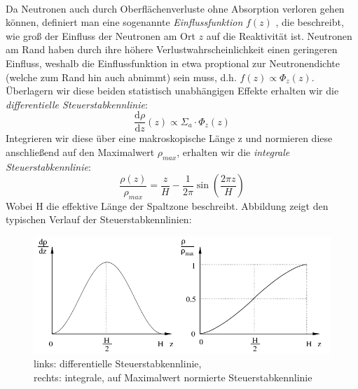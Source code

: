 	\ \\
	Da Neutronen auch durch Oberflächenverluste ohne Absorption verloren gehen können, definiert man eine sogenannte \textit{Einflussfunktion} $f(z)$ , die beschreibt, wie groß der Einfluss der Neutronen am Ort $z$ auf die Reaktivität ist. Neutronen am Rand haben durch ihre höhere Verlustwahrscheinlichkeit einen geringeren Einfluss, weshalb die Einflussfunktion in etwa proptional zur Neutronendichte (welche zum Rand hin auch abnimmt) sein muss, d.h. $f(z) \propto \Phi_z(z)$. Überlagern wir diese beiden statistisch unabhängigen Effekte erhalten wir die \textit{differentielle Steuerstabkennlinie}:\\
	$$\frac{\mathrm{d}\rho}{\mathrm{d}z}(z) \propto \Sigma_a \cdot \Phi_z(z)$$
	Integrieren wir diese über eine makroskopische Länge z und normieren diese anschließend auf den Maximalwert $\rho_{max}$, erhalten wir die \textit{integrale Steuerstabkennlinie}:
	$$\frac{\rho(z)}{\rho_{max}} = \frac{z}{H} - \frac{1}{2\pi} \sin{\left(\frac{2\pi z}{H}\right)}$$
	Wobei H die effektive Länge der Spaltzone beschreibt. Abbildung zeigt den typischen Verlauf der Steuerstabkennlinien:
		\begin{figure}[hp]
				\centering
				\captionsetup{justification=centering}
				\includegraphics[scale=0.4]{pic/sskl}
				\caption{links: differentielle Steuerstabkennlinie, 
						\\rechts: integrale, auf Maximalwert normierte Steuerstabkennlinie}
				\label{int:NeutrFlDichte}
		\end{figure}
	\ \\
	
	